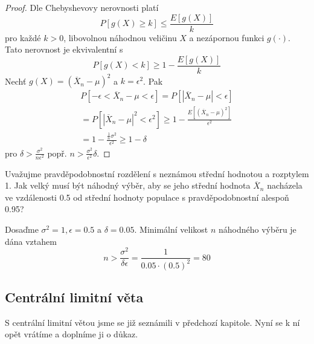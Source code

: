 \begin{proof}
Dle Chebyshevovy nerovnosti platí
\begin{equation*}
P[g(X) \ge k] \le \frac{E[g(X)]}{k}
\end{equation*}
pro každé $k > 0$, libovolnou náhodnou veličinu $X$ a nezápornou funkci $g(\cdot)$. Tato nerovnost je ekvivalentní s
\begin{equation*}
P[g(X) < k] \ge 1 - \frac{E[g(X)]}{k}
\end{equation*}
Nechť $g(X) = (\overline{X}_n - \mu)^2$ a $k = \epsilon^2$. Pak
\begin{gather*}
P[-\epsilon < \overline{X}_n - \mu < \epsilon] = P[|\overline{X}_n - \mu| < \epsilon]\\
= P[|\overline{X}_n - \mu|^2 < \epsilon^2] \ge 1 - \frac{E[(\overline{X}_n - \mu)^2]}{\epsilon^2}\\
= 1 - \frac{\frac{1}{n}\sigma^2}{\epsilon^2} \ge 1 - \delta
\end{gather*}
pro $\delta > \frac{\sigma^2}{n \epsilon^2}$ popř. $n > \frac{\sigma^2}{\epsilon^2} \delta$.
\end{proof}

\begin{example}
Uvažujme pravděpodobnostní rozdělení s neznámou střední hodnotou a rozptylem 1. Jak velký musí být náhodný výběr, aby se jeho střední hodnota $\overline{X}_n$ nacházela ve vzdálenosti 0.5 od střední hodnoty populace s pravděpodobnostní alespoň 0.95?

Dosaďme $\sigma^2 = 1, \epsilon = 0.5$ a $\delta = 0.05$. Minimální velikost $n$ náhodného výběru je dána vztahem
\begin{equation*}
n > \frac{\sigma^2}{\delta \epsilon} = \frac{1}{0.05 \cdot (0.5)^2} = 80
\end{equation*} 
\end{example}

\subsection{Centrální limitní věta}

S centrální limitní větou jsme se již seznámili v předchozí kapitole. Nyní se k ní opět vrátíme a doplníme ji o důkaz.

